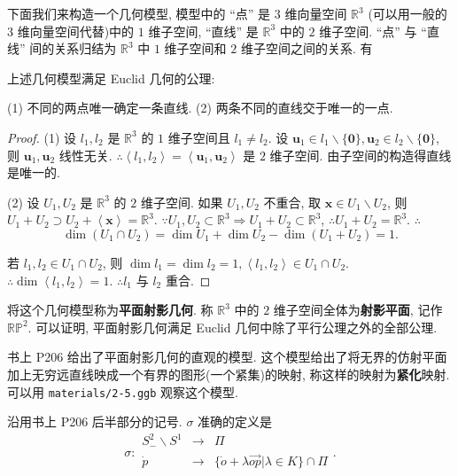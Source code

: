 \documentclass{ctexart}
\begin{document}
下面我们来构造一个几何模型, 模型中的 ``点'' 是 $3$ 维向量空间 $\mathbb{R}^3$ (可以用一般的 $3$ 维向量空间代替)中的 $1$ 维子空间, ``直线'' 是 $\mathbb{R}^3$ 中的 $2$ 维子空间. ``点'' 与 ``直线'' 间的关系归结为 $\mathbb{R}^3$ 中 $1$ 维子空间和 $2$ 维子空间之间的关系. 有
\begin{theorem}
    上述几何模型满足 Euclid 几何的公理:

    (1) 不同的两点唯一确定一条直线. (2) 两条不同的直线交于唯一的一点.
\end{theorem}
\begin{proof}
    (1) 设 $l_1,l_2$ 是 $\mathbb{R}^3$ 的 $1$ 维子空间且 $l_1\neq l_2$. 设 $\boldsymbol{u}_1\in l_1\backslash\{\boldsymbol{0}\},\boldsymbol{u}_2\in l_2\backslash\{\boldsymbol{0}\}$, 则 $\boldsymbol{u}_1,\boldsymbol{u}_2$ 线性无关. $\therefore\left<l_1,l_2\right>=\left<\boldsymbol{u}_1,\boldsymbol{u}_2\right>$ 是 $2$ 维子空间. 由子空间的构造得直线是唯一的.

    (2) 设 $U_1,U_2$ 是 $\mathbb{R}^3$ 的 $2$ 维子空间. 如果 $U_1,U_2$ 不重合, 取 $\boldsymbol{x}\in U_1\backslash U_2$, 则 $U_1+U_2\supset U_2+\left<\boldsymbol{x}\right>=\mathbb{R}^3$. $\because U_1,U_2\subset\mathbb{R}^3\Rightarrow U_1+U_2\subset\mathbb{R}^3$, $\therefore U_1+U_2=\mathbb{R}^3$. $\therefore$
    \[\dim(U_1\cap U_2)=\dim U_1+\dim U_2-\dim(U_1+U_2)=1.\]

    若 $l_1,l_2\in U_1\cap U_2$, 则 $\dim l_1=\dim l_2=1,\left<l_1,l_2\right>\in U_1\cap U_2$. $\therefore\dim\left<l_1,l_2\right>=1$. $\therefore l_1$ 与 $l_2$ 重合.
\end{proof}
将这个几何模型称为\textbf{平面射影几何}. 称 $\mathbb{R}^3$ 中的 $2$ 维子空间全体为\textbf{射影平面}, 记作 $\mathbb{RP}^2$. 可以证明, 平面射影几何满足 Euclid 几何中除了平行公理之外的全部公理.

书上 P206 给出了平面射影几何的直观的模型. 这个模型给出了将无界的仿射平面加上无穷远直线映成一个有界的图形(一个紧集)的映射, 称这样的映射为\textbf{紧化}映射. 可以用 \verb|materials/2-5.ggb| 观察这个模型.

沿用书上 P206 后半部分的记号. $\sigma$ 准确的定义是
\[\sigma:\begin{array}{rcl}
    S^2_-\backslash S^1 & \to & \varPi \\
    \dot{p} & \to & \{\dot{o}+\lambda\overrightarrow{op}|\lambda\in K\}\cap\varPi \\
\end{array}.\]
\end{document}
